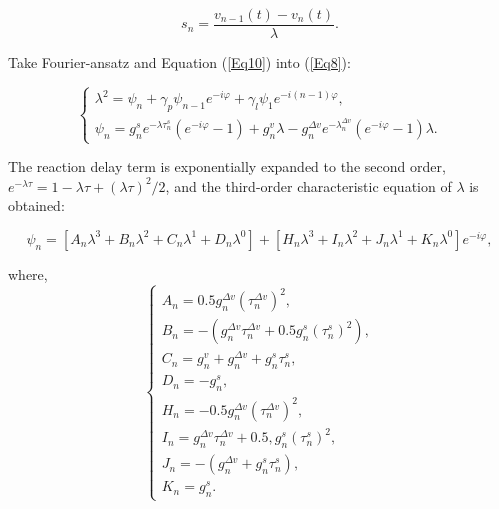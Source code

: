 \documentclass[journal]{IEEEtran}
\begin{document}
\begin{equation}
s_{n}=\frac{v_{n-1}(t)-v_{n}(t)}{\lambda}.
\label{Eq10}
\end{equation}

Take Fourier-ansatz and Equation (\ref{Eq10}) into (\ref{Eq8}):

\begin{equation}
\left\{\begin{array}{c}
\lambda^{2}=\psi_{n}+\gamma_{p} \psi_{n-1} e^{-i \varphi}+\gamma_{l} \psi_{1} e^{-i(n-1) \varphi}, \\
\psi_{n}=g_{n}^{s} e^{-\lambda \tau_{n}^{s}}\left(e^{-i \varphi}-1\right)+g_{n}^{v} \lambda-g_{n}^{\Delta v} e^{-\lambda_{n}^{\Delta v}}\left(e^{-i \varphi}-1\right) \lambda.
\end{array}\right.
\label{Eq11}
\end{equation}

The reaction delay term is exponentially expanded to the second order, $e^{-\lambda \tau}=1-\lambda \tau+ ({\lambda \tau})^2/2$, and the third-order characteristic equation of $\lambda$ is obtained:

\begin{small}
\begin{equation}
\psi_{n}\!=\!\left[A_{n} \lambda^{3}\!+\!B_{n} \lambda^{2}\!+\!C_{n} \lambda^{1}\!+\!D_{n} \lambda^{0}\right]\!+\!\left[H_{n} \lambda^{3}\!+\!I_{n} \lambda^{2}\!+\!J_{n} \lambda^{1}\!+\!K_{n} \lambda^{0}\right] e^{-i \varphi},
\label{Eq12}
\end{equation}
\end{small}
where,
\begin{equation}
\left\{\begin{array}{c}
A_{n}=0.5 g_{n}^{\Delta v}\left(\tau_{n}^{\Delta v}\right)^{2}, \\
B_{n}=-\left(g_{n}^{\Delta v} \tau_{n}^{\Delta v}+0.5 g_{n}^{s}\left(\tau_{n}^{s}\right)^{2}\right), \\
C_{n}=g_{n}^{v}+g_{n}^{\Delta v}+g_{n}^{s} \tau_{n}^{s}, \\
D_{n}=-g_{n}^{s}, \\
H_{n}=-0.5 g_{n}^{\Delta v}\left(\tau_{n}^{\Delta v}\right)^{2}, \\
I_{n}=g_{n}^{\Delta v} \tau_{n}^{\Delta v}+0.5, g_{n}^{s}\left(\tau_{n}^{s}\right)^{2}, \\
J_{n}=-\left(g_{n}^{\Delta v}+g_{n}^{s} \tau_{n}^{s}\right), \\
K_{n}=g_{n}^{s}.
\end{array}\right.
\label{Eq13}
\end{equation}
\end{document}
